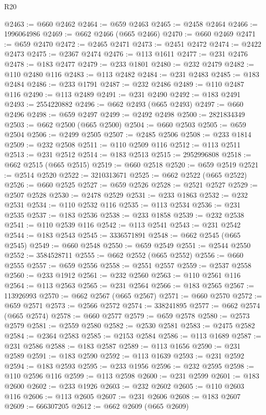 \begin{lexlean}{R20}
\begin{coremodule}
@2463 := @660 @2462
@2464 := @659 @2463
@2465 := @2458 @2464
@2466 := 1996064986
@2469 := @662 @2466 (@665 @2466)
@2470 := @660 @2469
@2471 := @659 @2470
@2472 := @2465 @2471
@2473 := @2451 @2472
@2474 := @2422 @2473
@2475 := @2367 @2474
@2476 := @113 @1611
@2477 := @231 @2476
@2478 := @183 @2477
@2479 := @233 @1801
@2480 := @232 @2479
@2482 := @110 @2480 @116
@2483 := @113 @2482
@2484 := @231 @2483
@2485 := @183 @2484
@2486 := @233 @1791
@2487 := @232 @2486
@2489 := @110 @2487 @116
@2490 := @113 @2489
@2491 := @231 @2490
@2492 := @183 @2491
@2493 := 2554220882
@2496 := @662 @2493 (@665 @2493)
@2497 := @660 @2496
@2498 := @659 @2497
@2499 := @2492 @2498
@2500 := 2821834349
@2503 := @662 @2500 (@665 @2500)
@2504 := @660 @2503
@2505 := @659 @2504
@2506 := @2499 @2505
@2507 := @2485 @2506
@2508 := @233 @1814
@2509 := @232 @2508
@2511 := @110 @2509 @116
@2512 := @113 @2511
@2513 := @231 @2512
@2514 := @183 @2513
@2515 := 2952996808
@2518 := @662 @2515 (@665 @2515)
@2519 := @660 @2518
@2520 := @659 @2519
@2521 := @2514 @2520
@2522 := 3210313671
@2525 := @662 @2522 (@665 @2522)
@2526 := @660 @2525
@2527 := @659 @2526
@2528 := @2521 @2527
@2529 := @2507 @2528
@2530 := @2478 @2529
@2531 := @233 @1863
@2532 := @232 @2531
@2534 := @110 @2532 @116
@2535 := @113 @2534
@2536 := @231 @2535
@2537 := @183 @2536
@2538 := @233 @1858
@2539 := @232 @2538
@2541 := @110 @2539 @116
@2542 := @113 @2541
@2543 := @231 @2542
@2544 := @183 @2543
@2545 := 3336571891
@2548 := @662 @2545 (@665 @2545)
@2549 := @660 @2548
@2550 := @659 @2549
@2551 := @2544 @2550
@2552 := 3584528711
@2555 := @662 @2552 (@665 @2552)
@2556 := @660 @2555
@2557 := @659 @2556
@2558 := @2551 @2557
@2559 := @2537 @2558
@2560 := @233 @1912
@2561 := @232 @2560
@2563 := @110 @2561 @116
@2564 := @113 @2563
@2565 := @231 @2564
@2566 := @183 @2565
@2567 := 113926993
@2570 := @662 @2567 (@665 @2567)
@2571 := @660 @2570
@2572 := @659 @2571
@2573 := @2566 @2572
@2574 := 338241895
@2577 := @662 @2574 (@665 @2574)
@2578 := @660 @2577
@2579 := @659 @2578
@2580 := @2573 @2579
@2581 := @2559 @2580
@2582 := @2530 @2581
@2583 := @2475 @2582
@2584 := @2364 @2583
@2585 := @2153 @2584
@2586 := @113 @1689
@2587 := @231 @2586
@2588 := @183 @2587
@2589 := @113 @1656
@2590 := @231 @2589
@2591 := @183 @2590
@2592 := @113 @1639
@2593 := @231 @2592
@2594 := @183 @2593
@2595 := @233 @1956
@2596 := @232 @2595
@2598 := @110 @2596 @116
@2599 := @113 @2598
@2600 := @231 @2599
@2601 := @183 @2600
@2602 := @233 @1926
@2603 := @232 @2602
@2605 := @110 @2603 @116
@2606 := @113 @2605
@2607 := @231 @2606
@2608 := @183 @2607
@2609 := 666307205
@2612 := @662 @2609 (@665 @2609)

\end{coremodule}
\end{lexlean}
